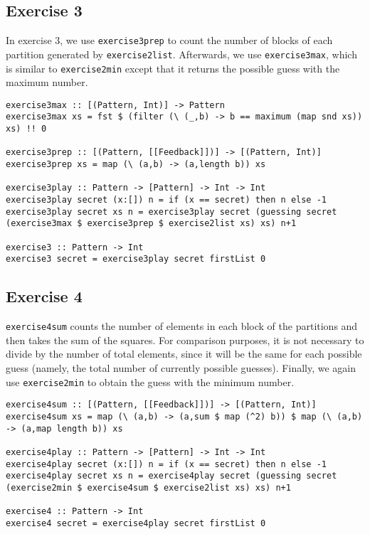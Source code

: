 \documentclass[a4paper,12pt]{amsart}
\begin{document}
\subsection*{Exercise 3}
In exercise 3, we use \texttt{exercise3prep} to count the number of blocks of each partition generated by \texttt{exercise2list}. Afterwards, we use \texttt{exercise3max}, which is similar to \texttt{exercise2min} except that it returns the possible guess with the maximum number. 
\begin{verbatim}
exercise3max :: [(Pattern, Int)] -> Pattern
exercise3max xs = fst $ (filter (\ (_,b) -> b == maximum (map snd xs)) xs) !! 0

exercise3prep :: [(Pattern, [[Feedback]])] -> [(Pattern, Int)]
exercise3prep xs = map (\ (a,b) -> (a,length b)) xs

exercise3play :: Pattern -> [Pattern] -> Int -> Int
exercise3play secret (x:[]) n = if (x == secret) then n else -1
exercise3play secret xs n = exercise3play secret (guessing secret (exercise3max $ exercise3prep $ exercise2list xs) xs) n+1

exercise3 :: Pattern -> Int
exercise3 secret = exercise3play secret firstList 0
\end{verbatim}

\subsection*{Exercise 4}
\texttt{exercise4sum} counts the number of elements in each block of the partitions and then takes the sum of the squares. For comparison purposes, it is not necessary to divide by the number of total elements, since it will be the same for each possible guess (namely, the total number of currently possible guesses). Finally, we again use \texttt{exercise2min} to obtain the guess with the minimum number.
\begin{verbatim}
exercise4sum :: [(Pattern, [[Feedback]])] -> [(Pattern, Int)]
exercise4sum xs = map (\ (a,b) -> (a,sum $ map (^2) b)) $ map (\ (a,b) -> (a,map length b)) xs

exercise4play :: Pattern -> [Pattern] -> Int -> Int
exercise4play secret (x:[]) n = if (x == secret) then n else -1
exercise4play secret xs n = exercise4play secret (guessing secret (exercise2min $ exercise4sum $ exercise2list xs) xs) n+1

exercise4 :: Pattern -> Int
exercise4 secret = exercise4play secret firstList 0
\end{verbatim}
\end{document}
